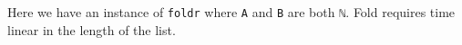 \begin{fence}
\begin{code}
\AgdaOperator{\AgdaPrimitive{+}}\AgdaSpace{}%
\AgdaSpace{}%
\AgdaOperator{\AgdaPrimitive{\AgdaUnderscore{}+\AgdaUnderscore{}}}\AgdaSpace{}%
\AgdaSpace{}%
\AgdaSymbol{(}\AgdaSpace{}%
\AgdaSpace{}%
\AgdaSpace{}%
\AgdaSpace{}%
\AgdaInductiveConstructor{[]}\AgdaSymbol{))}\<%
\\
%
\>[2]\<%
\\
\>[2][@{}l@{\AgdaIndent{0}}]%
\>[4]\AgdaSpace{}%
\AgdaOperator{\AgdaPrimitive{+}}\AgdaSpace{}%
\AgdaSymbol{(}\AgdaSpace{}%
\AgdaOperator{\AgdaPrimitive{+}}\AgdaSpace{}%
\AgdaSymbol{(}\AgdaSpace{}%
\AgdaOperator{\AgdaPrimitive{+}}\AgdaSpace{}%
\AgdaSpace{}%
\AgdaOperator{\AgdaPrimitive{\AgdaUnderscore{}+\AgdaUnderscore{}}}\AgdaSpace{}%
\AgdaSpace{}%
\AgdaSymbol{(}\AgdaSpace{}%
\AgdaSpace{}%
\AgdaInductiveConstructor{[]}\AgdaSymbol{)))}\<%
\\
%
\>[2]\<%
\\
\>[2][@{}l@{\AgdaIndent{0}}]%
\>[4]\AgdaSpace{}%
\AgdaOperator{\AgdaPrimitive{+}}\AgdaSpace{}%
\AgdaSymbol{(}\AgdaSpace{}%
\AgdaOperator{\AgdaPrimitive{+}}\AgdaSpace{}%
\AgdaSymbol{(}\AgdaSpace{}%
\AgdaOperator{\AgdaPrimitive{+}}\AgdaSpace{}%
\AgdaSymbol{(}\AgdaSpace{}%
\AgdaOperator{\AgdaPrimitive{+}}\AgdaSpace{}%
\AgdaSpace{}%
\AgdaOperator{\AgdaPrimitive{\AgdaUnderscore{}+\AgdaUnderscore{}}}\AgdaSpace{}%
\AgdaSpace{}%
\AgdaInductiveConstructor{[]}\AgdaSymbol{)))}\<%
\\
%
\>[2]\<%
\\
\>[2][@{}l@{\AgdaIndent{0}}]%
\>[4]\AgdaSpace{}%
\AgdaOperator{\AgdaPrimitive{+}}\AgdaSpace{}%
\AgdaSymbol{(}\AgdaSpace{}%
\AgdaOperator{\AgdaPrimitive{+}}\AgdaSpace{}%
\AgdaSymbol{(}\AgdaSpace{}%
\AgdaOperator{\AgdaPrimitive{+}}\AgdaSpace{}%
\AgdaSymbol{(}\AgdaSpace{}%
\AgdaOperator{\AgdaPrimitive{+}}\AgdaSpace{}%
\AgdaSymbol{)))}\<%
\\
%
\>[2]\<%
\end{code}
\end{fence}

Here we have an instance of \texttt{foldr} where \texttt{A} and
\texttt{B} are both \texttt{ℕ}. Fold requires time linear in the length
of the list.

